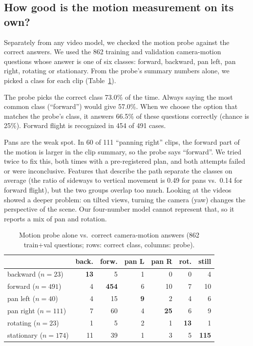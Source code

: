 \subsection{How good is the motion measurement on its own?}
Separately from any video model, we checked the motion probe against the
correct answers. We used the 862 training and validation camera-motion
questions whose answer is one of six classes: forward, backward, pan left,
pan right, rotating or stationary. From the probe's summary numbers alone,
we picked a class for each clip (Table~\ref{tab:confusion}).

The probe picks the correct class 73.0\% of the time. Always saying the
most common class (``forward'') would give 57.0\%. When we choose the
option that matches the probe's class, it answers 66.5\% of these questions
correctly (chance is 25\%). Forward flight is recognized in 454 of 491
cases.

Pans are the weak spot. In 60 of 111 ``panning right'' clips, the forward
part of the motion is larger in the clip summary, so the probe says
``forward''. We tried twice to fix this, both times with a pre-registered
plan, and both attempts failed or were inconclusive. Features that describe
the path separate the classes on average (the ratio of sideways to vertical
movement is 0.49 for pans vs.\ 0.14 for forward flight), but the two groups
overlap too much. Looking at the videos showed a deeper problem: on tilted
views, turning the camera (yaw) changes the perspective of the scene. Our
four-number model cannot represent that, so it reports a mix of pan and
rotation.

\begin{table}[t]
\centering
\caption{Motion probe alone vs.\ correct camera-motion answers (862
train+val questions; rows: correct class, columns: probe).}
\label{tab:confusion}
\footnotesize
\setlength{\tabcolsep}{4pt}
\begin{tabular}{@{}lrrrrrr@{}}
\toprule
 & back. & forw. & pan L & pan R & rot. & still \\
\midrule
backward ($n{=}23$) & \textbf{13} & 5 & 1 & 0 & 0 & 4 \\
forward ($n{=}491$) & 4 & \textbf{454} & 6 & 10 & 7 & 10 \\
pan left ($n{=}40$) & 4 & 15 & \textbf{9} & 2 & 4 & 6 \\
pan right ($n{=}111$) & 7 & 60 & 4 & \textbf{25} & 6 & 9 \\
rotating ($n{=}23$) & 1 & 5 & 2 & 1 & \textbf{13} & 1 \\
stationary ($n{=}174$) & 11 & 39 & 1 & 3 & 5 & \textbf{115} \\
\bottomrule
\end{tabular}
\end{table}
